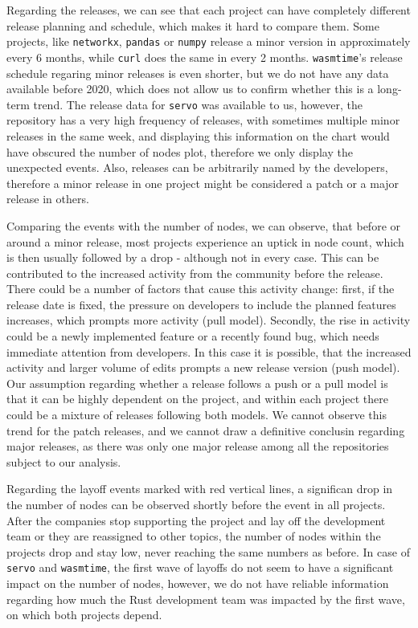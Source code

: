 Regarding the releases, we can see that each project can have completely different release planning and schedule, which makes it hard to compare them. Some projects, like \texttt{networkx}, \texttt{pandas} or \texttt{numpy} release a minor version in approximately every 6 months, while \texttt{curl} does the same in every 2 months. \texttt{wasmtime}'s release schedule regaring minor releases is even shorter, but we do not have any data available before 2020, which does not allow us to confirm whether this is a long-term trend. The release data for \texttt{servo} was available to us, however, the repository has a very high frequency of releases, with sometimes multiple minor releases in the same week, and displaying this information on the chart would have obscured the number of nodes plot, therefore we only display the unexpected events. Also, releases can be arbitrarily named by the developers, therefore a minor release in one project might be considered a patch or a major release in others.

Comparing the events with the number of nodes, we can observe, that before or around a minor release, most projects experience an uptick in node count, which is then usually followed by a drop - although not in every case. This can be contributed to the increased activity from the community before the release. There could be a number of factors that cause this activity change: first, if the release date is fixed, the pressure on developers to include the planned features increases, which prompts more activity (pull model). Secondly, the rise in activity could be a newly implemented feature or a recently found bug, which needs immediate attention from developers. In this case it is possible, that the increased activity and larger volume of edits prompts a new release version (push model). Our assumption regarding whether a release follows a push or a pull model is that it can be highly dependent on the project, and within each project there could be a mixture of releases following both models. We cannot observe this trend for the patch releases, and we cannot draw a definitive conclusin regarding major releases, as there was only one major release among all the repositories subject to our analysis.

Regarding the layoff events marked with red vertical lines, a significan drop in the number of nodes can be observed shortly before the event in all projects. After the companies stop supporting the project and lay off the development team or they are reassigned to other topics, the number of nodes within the projects drop and stay low, never reaching the same numbers as before. In case of \texttt{servo} and \texttt{wasmtime}, the first wave of layoffs do not seem to have a significant impact on the number of nodes, however, we do not have reliable information regarding how much the Rust development team was impacted by the first wave, on which both projects depend.

